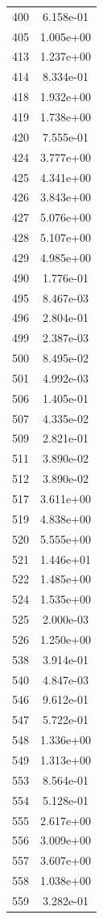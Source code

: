 \documentclass[12pt]{article}
\begin{document}
\begin{longtable}{@{}cc@{}}
400 & 6.158e-01 \\
405 & 1.005e+00 \\
413 & 1.237e+00 \\
414 & 8.334e-01 \\
418 & 1.932e+00 \\
419 & 1.738e+00 \\
420 & 7.555e-01 \\
424 & 3.777e+00 \\
425 & 4.341e+00 \\
426 & 3.843e+00 \\
427 & 5.076e+00 \\
428 & 5.107e+00 \\
429 & 4.985e+00 \\
490 & 1.776e-01 \\
495 & 8.467e-03 \\
496 & 2.804e-01 \\
499 & 2.387e-03 \\
500 & 8.495e-02 \\
501 & 4.992e-03 \\
506 & 1.405e-01 \\
507 & 4.335e-02 \\
509 & 2.821e-01 \\
511 & 3.890e-02 \\
512 & 3.890e-02 \\
517 & 3.611e+00 \\
519 & 4.838e+00 \\
520 & 5.555e+00 \\
521 & 1.446e+01 \\
522 & 1.485e+00 \\
524 & 1.535e+00 \\
525 & 2.000e-03 \\
526 & 1.250e+00 \\
538 & 3.914e-01 \\
540 & 4.847e-03 \\
546 & 9.612e-01 \\
547 & 5.722e-01 \\
548 & 1.336e+00 \\
549 & 1.313e+00 \\
553 & 8.564e-01 \\
554 & 5.128e-01 \\
555 & 2.617e+00 \\
556 & 3.009e+00 \\
557 & 3.607e+00 \\
558 & 1.038e+00 \\
559 & 3.282e-01 \\

\end{longtable}
\end{document}
